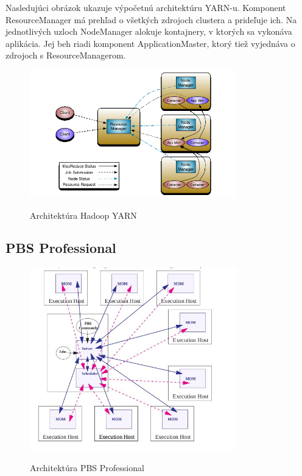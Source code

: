 \documentclass[printed,11pt,twoside,color,cover,table]{fithesis3}
\begin{document}
Nasledujúci obrázok ukazuje výpočetnú architektúru YARN-u. Komponent ResourceManager má prehľad o všetkých zdrojoch clustera a prideľuje ich. Na jednotlivých uzloch NodeManager alokuje kontajnery, v ktorých sa vykonáva
aplikácia. Jej beh riadi komponent ApplicationMaster, ktorý tiež vyjednáva o zdrojoch s ResourceManagerom.
\begin{figure}
\begin{center}
       \includegraphics[width=0.8\textwidth]{images/yarn_architecture.png}
       \caption{Architektúra Hadoop YARN}\cite{pbs_pro_arch}
\end{center}
\end{figure}

\subsection{PBS Professional}
\begin{figure}
\begin{center}
       \includegraphics[width=0.8\textwidth]{images/pbspro-arch.jpg}
       \caption{Architektúra PBS Professional}\cite{pbs_pro_arch}
\end{center}
\end{figure}
\end{document}
